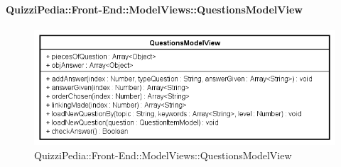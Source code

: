 \paragraph{QuizziPedia::Front-End::ModelViews::QuestionsModelView}

\label{QuizziPedia::Front-End::ModelViews::QuestionsModelView}

\begin{figure}[ht]
	\centering
	\includegraphics[scale=0.75,keepaspectratio]{UML/Classi/Front-End/QuizziPedia_Front-end_ModelView_QuestionsModelView.png}
	\caption{QuizziPedia::Front-End::ModelViews::QuestionsModelView}
\end{figure} \FloatBarrier


